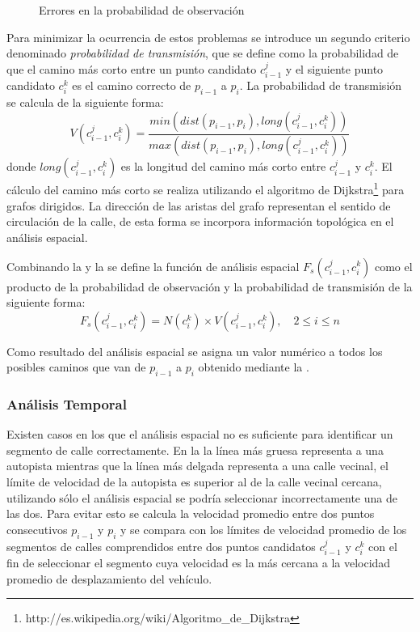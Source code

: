\begin{figure}[h*]
	\centering
	
	\caption{\label{fig:probabilidad_transmision} Errores en la probabilidad de observación}	
\end{figure}

Para minimizar la ocurrencia de estos problemas se introduce un segundo criterio denominado \emph{probabilidad de transmisión}, que se define como la probabilidad de que el camino más corto entre un punto candidato $c_{i-1}^{j}$ y el siguiente punto candidato $c_{i}^{k}$ es el camino correcto de $p_{i-1}$ a $p_i$. La probabilidad de transmisión se calcula de la siguiente forma: 
\begin{equation} \label{probabilidad_de_transmision}
V(c_{i-1}^{j}, c_{i}^{k}) = \frac { min( dist(p_{i-1}, p_i), long(c_{i-1}^{j}, c_{i}^{k})) }{ max (dist(p_{i-1}, p_i), long(c_{i-1}^{j}, c_{i}^{k})) }
\end{equation}
donde $long(c_{i-1}^{j}, c_{i}^{k})$ es la longitud del camino más corto entre $c_{i-1}^{j}$ y $c_{i}^{k}$. El cálculo del camino más corto se realiza utilizando el algoritmo de Dijkstra\footnote{http://es.wikipedia.org/wiki/Algoritmo\_de\_Dijkstra} para grafos dirigidos. La dirección de las aristas del grafo representan el sentido de circulación de la calle, de esta forma se incorpora información topológica en el análisis espacial. 

Combinando la  y la  se define la función de análisis espacial $F_s(c_{i-1}^{j},c_{i}^{k})$ como el producto de la probabilidad de observación y la probabilidad de transmisión de la siguiente forma:
\begin{equation} \label{funcion_espacial}
F_s(c_{i-1}^{j},c_{i}^{k}) = N(c_{i}^{k}) \times V(c_{i-1}^{j}, c_{i}^{k}), \quad 2 \le i \le n 
\end{equation}

Como resultado del análisis espacial se asigna un valor numérico a todos los posibles caminos que van de $p_{i-1}$ a $p_i$ obtenido mediante la .

\subsubsection{Análisis Temporal}

Existen casos en los que el análisis espacial no es suficiente para identificar un segmento de calle correctamente. En la  la línea más gruesa representa a una autopista mientras que la línea más delgada representa a una calle vecinal, el límite de velocidad de la autopista es superior al de la calle vecinal cercana, utilizando sólo el análisis espacial se podría seleccionar incorrectamente una de las dos. Para evitar esto se calcula la velocidad promedio entre dos puntos consecutivos $p_{i-1}$ y $p_i$ y se compara con los límites de velocidad promedio de los segmentos de calles comprendidos entre dos puntos candidatos $c_{i-1}^{j}$ y $c_{i}^{k}$ con el fin de seleccionar el segmento cuya velocidad es la más cercana a la velocidad promedio de desplazamiento del vehículo.

